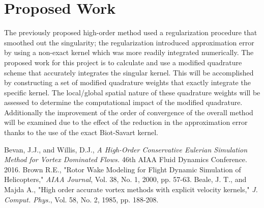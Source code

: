 \documentclass[letterpaper,10pt]{article}
\begin{document}
\section*{Proposed Work}
The previously proposed high-order method used a regularization procedure that smoothed out the singularity; the regularization introduced approximation error by using a non-exact kernel which was more readily integrated numerically. The proposed work for this project is to calculate and use a modified quadrature scheme that accurately integrates the singular kernel. This will be accomplished by constructing a set of modified quadrature weights that exactly integrate the specific kernel. The local/global spatial nature of these quadrature weights will be assessed to determine the computational impact of the modified quadrature. Additionally the improvement of the order of convergence of the overall method will be examined due to the effect of the reduction in the approximation error thanks to the use of the exact Biot-Savart kernel.

\begin{thebibliography}{9}%
Bevan, J.J., and Willis, D.J., \textit{A High-Order Conservative Eulerian Simulation Method for Vortex Dominated Flows.} 46th AIAA Fluid Dynamics Conference. 2016.
Brown R.E., "Rotor Wake Modeling for Flight Dynamic Simulation of Helicopters," \textit{AIAA Journal}, Vol. 38, No. 1, 2000, pp. 57-63.
Beale, J. T., and Majda A., "High order accurate vortex methods with explicit velocity kernels," \textit{J. Comput. Phys.}, Vol. 58, No. 2, 1985, pp. 188-208.
\end{thebibliography}
\end{document}
